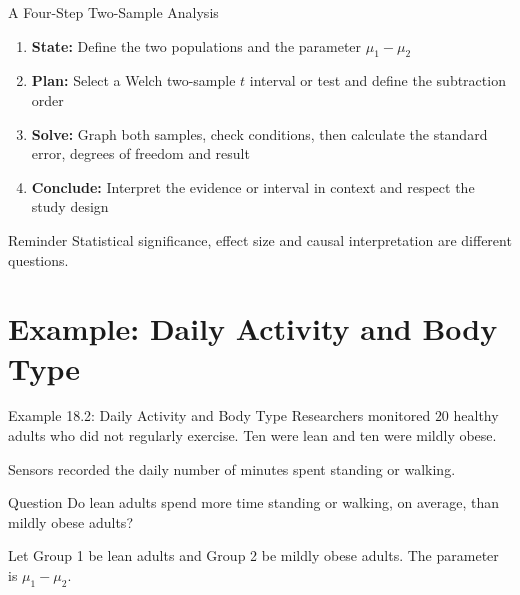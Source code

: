 \documentclass[aspectratio=169,10pt]{beamer}
\begin{document}
\begin{frame}{A Four-Step Two-Sample Analysis}
\begin{enumerate}
  \item \textbf{State:} Define the two populations and the parameter $\mu_1-\mu_2$
  \item \textbf{Plan:} Select a Welch two-sample $t$ interval or test and define the subtraction order
  \item \textbf{Solve:} Graph both samples, check conditions, then calculate the standard error, degrees of freedom and result
  \item \textbf{Conclude:} Interpret the evidence or interval in context and respect the study design
\end{enumerate}

\begin{block}{Reminder}
Statistical significance, effect size and causal interpretation are different questions.
\end{block}
\end{frame}


\section{Example: Daily Activity and Body Type}

\begin{frame}{Example 18.2: Daily Activity and Body Type}
Researchers monitored $20$ healthy adults who did not regularly exercise. Ten were lean and ten were mildly obese.

Sensors recorded the daily number of minutes spent standing or walking.

\begin{block}{Question}
Do lean adults spend more time standing or walking, on average, than mildly obese adults?
\end{block}

Let Group 1 be lean adults and Group 2 be mildly obese adults. The parameter is $\mu_1-\mu_2$.
\end{frame}
\end{document}
